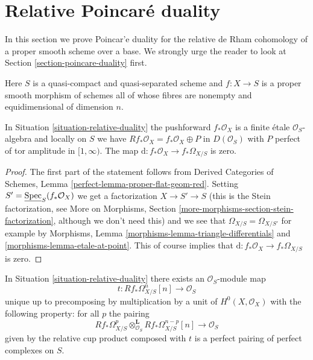\section{Relative Poincar\'e duality}
\label{section-relative-poincare-duality}

\noindent
In this section we prove Poincar'e duality for the relative de Rham cohomology
of a proper smooth scheme over a base. We strongly urge the reader to
look at Section \ref{section-poincare-duality} first.

\begin{situation}
\label{situation-relative-duality}
Here $S$ is a quasi-compact and quasi-separated scheme and
$f : X \to S$ is a proper smooth morphism of schemes all of whose
fibres are nonempty and equidimensional of dimension $n$.
\end{situation}

\begin{lemma}
\label{lemma-relative-bottom-part-degenerates}
In Situation \ref{situation-relative-duality} the pushforward
$f_*\mathcal{O}_X$ is a finite \'etale $\mathcal{O}_S$-algebra
and locally on $S$ we have $Rf_*\mathcal{O}_X = f_*\mathcal{O}_X \oplus P$
in $D(\mathcal{O}_S)$ with $P$ perfect of tor amplitude in $[1, \infty)$.
The map $\text{d} : f_*\mathcal{O}_X \to f_*\Omega_{X/S}$ is zero.
\end{lemma}

\begin{proof}
The first part of the statement follows from
Derived Categories of Schemes, Lemma \ref{perfect-lemma-proper-flat-geom-red}.
Setting $S' = \underline{\mathop{\mathrm{Spec}}}_S(f_*\mathcal{O}_X)$ we get a factorization
$X \to S' \to S$ (this is the Stein factorization, see
More on Morphisms, Section \ref{more-morphisms-section-stein-factorization},
although we don't need this)
and we see that $\Omega_{X/S} = \Omega_{X/S'}$ for example by
Morphisms, Lemma \ref{morphisms-lemma-triangle-differentials} and
\ref{morphisms-lemma-etale-at-point}. This of course implies that
$\text{d} : f_*\mathcal{O}_X \to f_*\Omega_{X/S}$ is zero.
\end{proof}

\begin{lemma}
\label{lemma-relative-duality-hodge}
In Situation \ref{situation-relative-duality} there exists an
$\mathcal{O}_S$-module map
$$
t : Rf_*\Omega^n_{X/S}[n] \longrightarrow \mathcal{O}_S
$$
unique up to precomposing by multiplication by a unit of
$H^0(X, \mathcal{O}_X)$ with the following property: for all $p$ the pairing
$$
Rf_*\Omega^p_{X/S}
\otimes_{\mathcal{O}_S}^\mathbf{L}
Rf_*\Omega^{n - p}_{X/S}[n]
\longrightarrow
\mathcal{O}_S
$$
given by the relative cup product composed with $t$
is a perfect pairing of perfect complexes on $S$.
\end{lemma}

